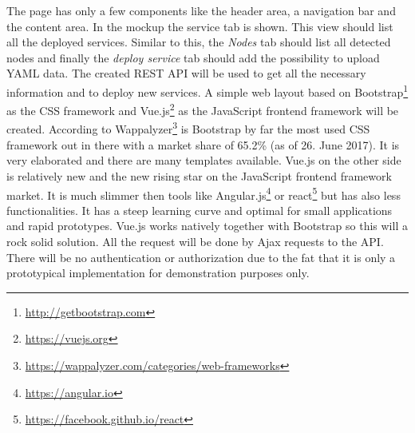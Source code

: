 The page has only a few components like the header area, a navigation bar and the content area.
In the mockup the service tab is shown.
This view should list all the deployed services.
Similar to this, the \textit{Nodes} tab should list all detected nodes and finally the \textit{deploy service} tab should add the possibility to upload \ac{YAML} data.
The created \ac{REST} \ac{API} will be used to get all the necessary information and to deploy new services.
A simple web layout based on Bootstrap\footnote{\url{http://getbootstrap.com}} as the CSS framework and Vue.js\footnote{\url{https://vuejs.org}} as the JavaScript frontend framework will be created.
According to Wappalyzer\footnote{\url{https://wappalyzer.com/categories/web-frameworks}} is Bootstrap by far the most used \ac{CSS} framework out in there with a market share of 65.2\% (as of 26. June 2017).
It is very elaborated and there are many templates available.
Vue.js on the other side is relatively new and the new rising star on the JavaScript frontend framework market.
It is much slimmer then tools like Angular.js\footnote{\url{https://angular.io}} or react\footnote{\url{https://facebook.github.io/react}} but has also less functionalities.
It has a steep learning curve and optimal for small applications and rapid prototypes.
Vue.js works natively together with Bootstrap so this will a rock solid solution.
All the request will be done by Ajax requests to the \ac{API}.
There will be no authentication or authorization due to the fat that it is only a prototypical implementation for demonstration purposes only.


